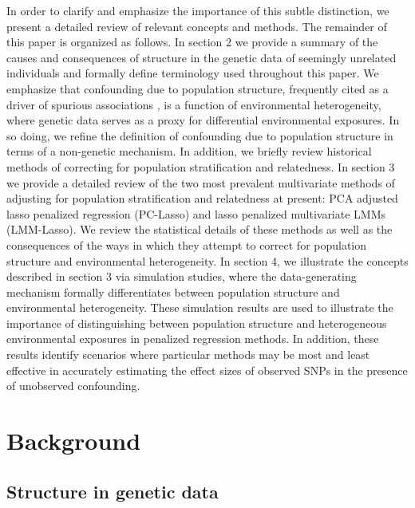 In order to clarify and emphasize the importance of this subtle distinction, we present a detailed review of relevant concepts and methods. The remainder of this paper is organized as follows. In section 2 we provide a summary of the causes and consequences of structure in the genetic data of seemingly unrelated individuals and formally define terminology used throughout this paper. We emphasize that confounding due to population structure, frequently cited as a driver of spurious associations \cite{Sillanpaeae2011, sul2018population}, is a function of environmental heterogeneity, where genetic data serves as a proxy for differential environmental exposures. In so doing, we refine the definition of confounding due to population structure in terms of a non-genetic mechanism. In addition, we briefly review historical methods of correcting for population stratification and relatedness. In section 3 we provide a detailed review of the two most prevalent multivariate methods of adjusting for population stratification and relatedness at present: PCA adjusted lasso penalized regression (PC-Lasso) and lasso penalized multivariate LMMs (LMM-Lasso). We review the statistical details of these methods as well as the consequences of the ways in which they attempt to correct for population structure and environmental heterogeneity. In section 4, we illustrate the concepts described in section 3 via simulation studies, where the data-generating mechanism formally differentiates between population structure and environmental heterogeneity. These simulation results are used to illustrate the importance of distinguishing between population structure and heterogeneous environmental exposures in penalized regression methods. In addition, these results identify scenarios where particular methods may be most and least effective in accurately estimating the effect sizes of observed SNPs in the presence of unobserved confounding.





\section{Background}

\subsection{Structure in genetic data}

